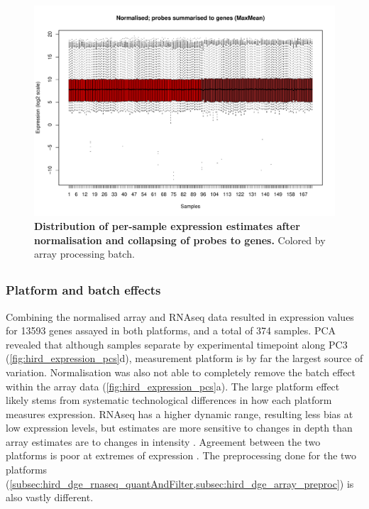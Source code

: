 \begin{figure}
    \centering
    \includegraphics[width=1.0\textwidth]{mainmatter/figures/chapter_02/array_data_setup.array_intensity_boxplots.MaxMean.pdf}
    \caption{
        \textbf{Distribution of per-sample expression estimates after normalisation and collapsing of probes to genes.}
        Colored by array processing batch.
    }
    \label{fig:hird_array_boxplots_MaxMean}
\end{figure}

\subsection{}

\subsubsection{Platform and batch effects}
\label{subsubsec:hird_dge_platform_and_batch_effects}

Combining the normalised array and \gls{RNAseq} data resulted in expression values for \num{13593} genes assayed in both platforms, and a total of 374 samples.
\gls{PCA} revealed that although samples separate by experimental timepoint along \gls{PC}3 (\cref{fig:hird_expression_pcs}d), measurement platform is by far the largest source of variation.
Normalisation was also not able to completely remove the batch effect within the array data (\cref{fig:hird_expression_pcs}a).
The large platform effect likely stems from systematic technological differences in how each platform measures expression.
\gls{RNAseq} has a higher dynamic range, resulting less bias at low expression levels, but estimates are more sensitive to changes in depth than array estimates are to changes in intensity \autocite{robinson2015NestedParallelExperiment}.
Agreement between the two platforms is poor at extremes of expression \autocite{wang2009RNASeqRevolutionaryTool,ma2017JointBayesianModel}.
The preprocessing done for the two platforms (\cref{subsec:hird_dge_rnaseq_quantAndFilter,subsec:hird_dge_array_preproc}) is also vastly different.

